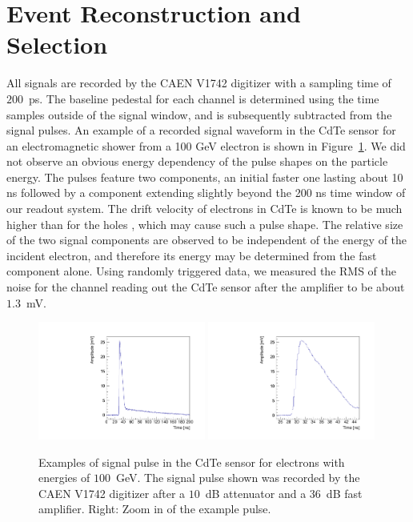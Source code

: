 
\section{Event Reconstruction and Selection }
\label{sec:reco}

All signals are recorded by the CAEN V1742 digitizer with a sampling time of $200$~ps.
The baseline pedestal for each channel is determined using the time samples outside of
the signal window, and is subsequently subtracted from the signal pulses. An example of a recorded
signal waveform in the CdTe sensor for an electromagnetic shower from a 100 GeV electron is shown 
in Figure~\ref{fig:Pulses}. We did not observe an obvious energy dependency of the pulse shapes on 
the particle energy. The pulses feature two components, an initial faster one lasting about 10 ns 
followed by a component extending slightly beyond the 200 ns time window of our readout system. 
The drift velocity of electrons in CdTe is known to be much higher than for the 
holes \cite{scpulses}, which may cause such a pulse shape. The relative size of 
the two signal components are observed to be independent of the energy of the 
incident electron, and therefore its energy may be determined from the fast 
component alone. Using randomly triggered data, we measured the RMS of 
the noise for the channel reading out the CdTe sensor after the amplifier to be about $1.3$~mV. 

\begin{figure}[htbp] 
\centering
\includegraphics[width=0.49\textwidth]{figures/CdTe_pulse.pdf}
\includegraphics[width=0.49\textwidth]{figures/CdTe_pulseZ.pdf} 
\caption{Examples of signal pulse in the CdTe sensor for electrons with energies of $100$~GeV. 
The signal pulse shown was recorded by the CAEN V1742 digitizer after a $10$~dB 
attenuator and a $36$~dB fast amplifier. Right: Zoom in of the example pulse. } 
\label{fig:Pulses} 
\end{figure} 

